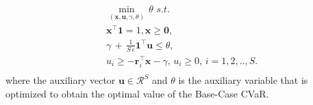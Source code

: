 \begin{equation}
\label{eq:6.7}
\begin{split}
& \min_{(\mathbf{x},\mathbf{u},\gamma,\theta)} \, \theta \, \, s.t. \\
& \mathbf{x}^{\top}\mathbf{1}=1, \mathbf{x} \geq \mathbf{0}, \\
& \gamma \, + \, \frac{1}{S \, \epsilon} \mathbf{1}^{\top}\mathbf{u} \leq \theta, \\
& u_{i} \geq -\mathbf{r}_{i}^{\top}\mathbf{x}-\gamma, \, u_{i} \geq 0, \, i=1,2,..,S. \\
\end{split}
\end{equation}
where the auxiliary vector $\mathbf{u} \in \mathcal{R}^S$ and $\theta$ is the auxiliary variable that is optimized to obtain the optimal value of the Base-Case CVaR.

